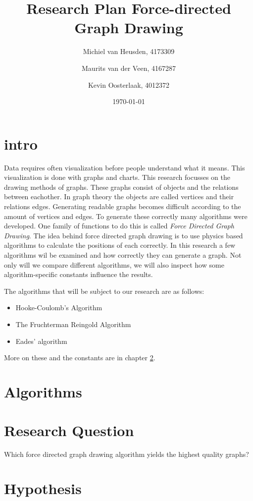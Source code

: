 \documentclass[a4paper,12pt]{article}
\title{Research Plan Force-directed Graph Drawing}
\author{Michiel van Heusden, 4173309 \and Maurits van der Veen, 4167287 \and Kevin Oosterlaak, 4012372}
\date{\today}
\begin{document}
  \maketitle
  \tableofcontents
  \section{intro}
  Data requires often visualization before people understand what it means.
  This visualization is done with graphs and charts.
  This research focusses on the drawing methods of graphs.
  These graphs consist of objects and the relations between eachother.
  In graph theory the objects are called vertices and their relations edges.
  Generating readable graphs becomes difficult according to the amount of vertices and edges.
  To generate these correctly many algorithms were developed.
  One family of functions to do this is called \emph{Force Directed Graph Drawing}.
  The idea behind force directed graph drawing is to use physics based algorithms to calculate the positions of each correctly.
  In this research a few algorithms wil be examined and how correctly they can generate a graph.
  Not only will we compare different algorithms, we will also inspect how some algorithm-specific constants influence the results.

  The algorithms that will be subject to our research are as follows:
  \begin{itemize}
    \item Hooke-Coulomb's Algorithm
    \item The Fruchterman Reingold Algorithm
    \item Eades' algorithm
  \end{itemize}
  More on these and the constants are in chapter \ref{par:algorithms}.

  \section{Algorithms}\label{par:algorithms}

  \section{Research Question}
    Which force directed graph drawing algorithm yields the highest quality graphs?

  \section{Hypothesis}
\end{document}
